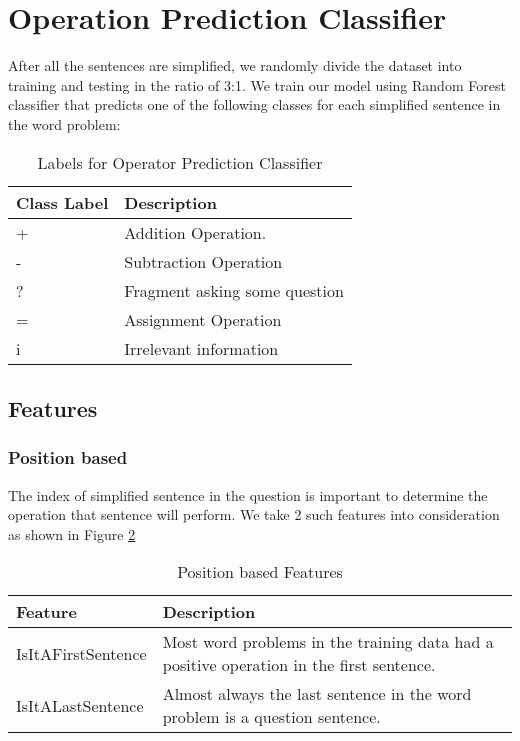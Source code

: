 \documentclass[11pt]{article}
\begin{document}
\section{Operation Prediction Classifier}

After all the sentences are simplified, we randomly divide the dataset into training and testing in the ratio of 3:1. We train our model using Random Forest classifier that predicts one of the following classes for each simplified sentence in the word problem:

\begin{table}[h!]
\centering
\begin{tabular}{ | m{1.6cm} | m{4cm} |}
\hline
\textbf{\small Class Label} & \textbf{\small Description}\\ \hline
\small + & \small Addition Operation.\\ \hline
\small - & \small Subtraction Operation\\ \hline
\small ? & \small Fragment asking some question\\ \hline
\small = & \small Assignment Operation\\ \hline
\small i & \small Irrelevant information \\ \hline
\end{tabular}
\caption{Labels for Operator Prediction Classifier}
\label{figure:7}
\end{table}

\subsection{Features}
\subsubsection{Position based}
The index of simplified sentence in the question is important to determine the operation that sentence will perform. We take 2 such features into consideration as shown in Figure \ref{figure:8}
\begin{table}[h!]
\centering
\begin{tabular}{ | m{3cm} | m{4cm} |}
\hline
\textbf{\small Feature} & \textbf{\small Description}\\ \hline
\small IsItAFirstSentence & \small Most word problems in the training data had a positive operation in the first sentence.\\ \hline
\small IsItALastSentence & \small Almost always the last sentence in the word problem is a question sentence.\\ \hline
\end{tabular}
\caption{Position based Features}
\label{figure:8}
\end{table}
\vspace{0.25cm}
\end{document}
